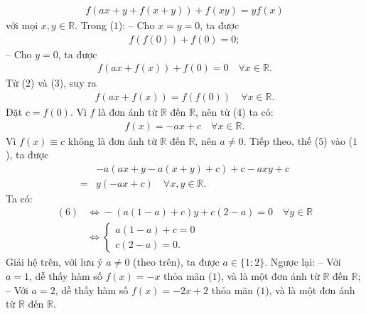\begin{multicols}{2}
	\begin{align*}
		f\!\left( {ax \!+\! y \!+\! f\left( {x \!+\! y} \right)} \right) \!+\! f\!\left( {xy} \right) \!=\! yf\left( x \right) \tag{$1$}
	\end{align*}
	với mọi $x,y \in \mathbb{R}$.
	\vskip 0.05cm
	Trong ($1$):
	\vskip 0.05cm
	-- Cho $x = y = 0$, ta được
	\begin{align*}
		f\left( {f\left( 0 \right)} \right) + f\left( 0 \right) = 0; \tag{$2$}
	\end{align*}
	-- Cho $y = 0$, ta được
	\begin{align*}
		f\left( {ax + f\left( x \right)} \right) + f\left( 0 \right) = 0 \quad \forall x \in \mathbb{R}. \tag{$3$}
	\end{align*}
	Từ ($2$) và ($3$), suy ra
	\begin{align*}
		f\left( {ax + f\left( x \right)} \right) = f\left( {f\left( 0 \right)} \right) \quad\forall x \in \mathbb{R}. \tag{$4$}
	\end{align*}
	Đặt $c = f(0)$.  Vì  $f$ là đơn ánh từ $\mathbb{R}$  đến  $\mathbb{R}$, nên từ ($4$) ta có:
	\begin{align*}
		f\left( x \right) =  - ax + c \quad \forall x \in \mathbb{R}. \tag{$5$}
	\end{align*}
	Vì  $f(x) \equiv c$ không là đơn ánh từ  $\mathbb{R}$ đến  $\mathbb{R}$, nên $a \ne 0$.
	\vskip 0.05cm
	Tiếp theo, thế ($5$) vào ($1$), ta được
	\begin{align*}
		&- a\left( {ax + y - a\left( {x + y} \right) + c} \right) + c - axy + c \\
		= &y\left( { - ax + c} \right) \quad \forall x,y \in \mathbb{R}. \tag{$6$}
	\end{align*}
	Ta có:
	\begin{align*}
		(6) \!&\Leftrightarrow  \!-\! \left(\! {a\left(\! {1 \!-\! a}\! \right) \!+\! c} \!\right)\!y \!+\! c\!\left( {2 \!-\! a} \!\right) \!=\! 0 \quad\!\!\! \forall y \!\in\! \mathbb{R}\\
		&\Leftrightarrow \begin{cases}
			a(1-a) + c = 0\\
			c(2-a) = 0.
		\end{cases}
	\end{align*}  
	Giải hệ trên, với lưu ý $a \ne 0$ (theo trên), ta được $a \in \{1; 2\}$.
	\vskip 0.05cm
	Ngược lại:
	\vskip 0.05cm
	-- Với $a = 1$, dễ thấy hàm số $f(x) = -x$ thỏa mãn ($1$), và là một đơn ánh từ  $\mathbb{R}$ đến  $\mathbb{R}$;
	\vskip 0.05cm
	-- Với $a = 2$, dễ thấy hàm số  $f(x) = -2x + 2$ thỏa mãn ($1$), và là một đơn ánh từ $\mathbb{R}$ đến $\mathbb{R}$.

\end{multicols}
